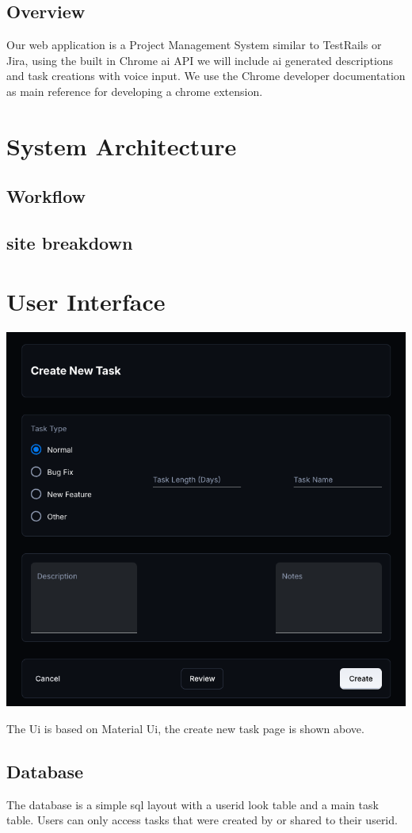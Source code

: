 \documentclass{article}
\begin{document}
\subsection{Overview}
Our web application is a Project Management System similar to TestRails or Jira, using the built in Chrome \Gls{ai} API we will include ai generated descriptions and task creations with voice input. We use the Chrome developer documentation\cite{dev} as main reference for developing a chrome extension.

\section{System Architecture}

\subsection{Workflow}


\subsection{site breakdown}

 
\section{User Interface}

\includegraphics[width=0.9\linewidth]{../logo/mockup.png} 

The Ui is based on Material Ui\cite{mui}, the create new task page is shown above.

\subsection{Database}
The database is a simple \Gls{sql} layout with a userid look table and a main task table. Users can only access tasks that were created by or shared to their userid.


\pagebreak
\printglossaries

\printbibliography
\end{document}
